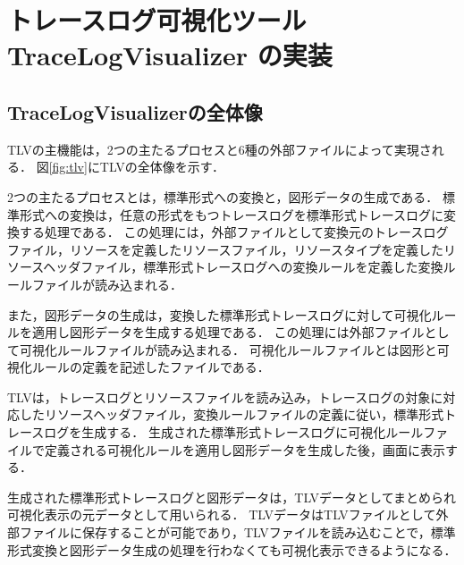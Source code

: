 \chapter{トレースログ可視化ツール TraceLogVisualizer の実装}

\section{TraceLogVisualizerの全体像}

TLVの主機能は，2つの主たるプロセスと6種の外部ファイルによって実現される．
図\ref{fig:tlv}にTLVの全体像を示す．

2つの主たるプロセスとは，標準形式への変換と，図形データの生成である．
標準形式への変換は，任意の形式をもつトレースログを標準形式トレースログに変換する処理である．
この処理には，外部ファイルとして変換元のトレースログファイル，リソースを定義したリソースファイル，リソースタイプを定義したリソースヘッダファイル，標準形式トレースログへの変換ルールを定義した変換ルールファイルが読み込まれる．

また，図形データの生成は，変換した標準形式トレースログに対して可視化ルールを適用し図形データを生成する処理である．
この処理には外部ファイルとして可視化ルールファイルが読み込まれる．
可視化ルールファイルとは図形と可視化ルールの定義を記述したファイルである．

TLVは，トレースログとリソースファイルを読み込み，トレースログの対象に対応したリソースヘッダファイル，変換ルールファイルの定義に従い，標準形式トレースログを生成する．
生成された標準形式トレースログに可視化ルールファイルで定義される可視化ルールを適用し図形データを生成した後，画面に表示する．


生成された標準形式トレースログと図形データは，TLVデータとしてまとめられ可視化表示の元データとして用いられる．
TLVデータはTLVファイルとして外部ファイルに保存することが可能であり，TLVファイルを読み込むことで，標準形式変換と図形データ生成の処理を行わなくても可視化表示できるようになる．


